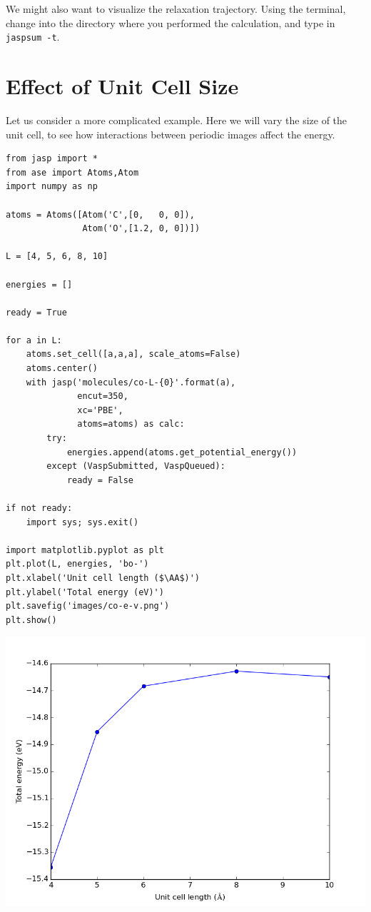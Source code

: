 \documentclass[11pt]{article}
\begin{document}
We might also want to visualize the relaxation trajectory. Using the terminal, change into the directory where you performed the calculation, and type in \verb~jaspsum -t~.


\section{Effect of Unit Cell Size}
\label{sec-7}

Let us consider a more complicated example. Here we will vary the size of the unit cell, to see how interactions between periodic images affect the energy.

\begin{verbatim}
from jasp import *
from ase import Atoms,Atom
import numpy as np

atoms = Atoms([Atom('C',[0,   0, 0]),
               Atom('O',[1.2, 0, 0])])

L = [4, 5, 6, 8, 10]

energies = []

ready = True

for a in L:
    atoms.set_cell([a,a,a], scale_atoms=False)
    atoms.center()
    with jasp('molecules/co-L-{0}'.format(a),
              encut=350,
              xc='PBE',
              atoms=atoms) as calc:
        try:
            energies.append(atoms.get_potential_energy())
        except (VaspSubmitted, VaspQueued):
            ready = False

if not ready:
    import sys; sys.exit()

import matplotlib.pyplot as plt
plt.plot(L, energies, 'bo-')
plt.xlabel('Unit cell length ($\AA$)')
plt.ylabel('Total energy (eV)')
plt.savefig('images/co-e-v.png')
plt.show()
\end{verbatim}

\includegraphics[width=.9\linewidth]{./images/co-e-v.png}
\end{document}
